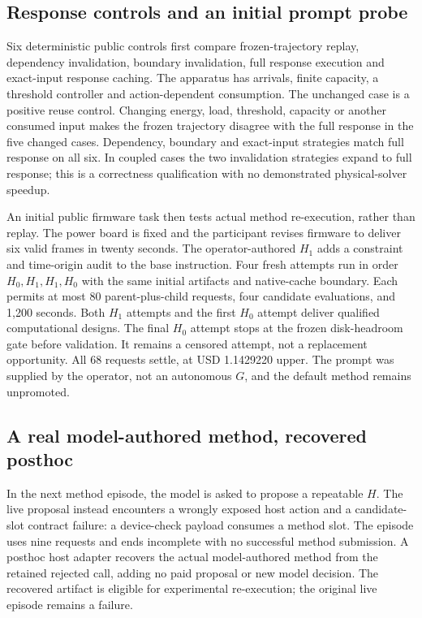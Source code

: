 \subsection{Response controls and an initial prompt probe}
Six deterministic public controls first compare frozen-trajectory replay,
dependency invalidation, boundary invalidation, full response execution and
exact-input response caching. The apparatus has arrivals, finite capacity, a
threshold controller and action-dependent consumption. The unchanged case is
a positive reuse control. Changing energy, load, threshold, capacity or another
consumed input makes the frozen trajectory disagree with the full response in
the five changed cases. Dependency, boundary and exact-input strategies match
full response on all six. In coupled cases the two invalidation strategies
expand to full response; this is a correctness qualification with no demonstrated
physical-solver speedup.

An initial public firmware task then tests actual method re-execution, rather
than replay. The power board is fixed and the participant revises firmware to
deliver six valid frames in twenty seconds. The operator-authored $H_1$ adds a
constraint and time-origin audit to the base instruction. Four fresh attempts
run in order $H_0,H_1,H_1,H_0$ with the same initial artifacts and native-cache
boundary. Each permits at most 80 parent-plus-child requests, four candidate
evaluations, and 1,200 seconds. Both $H_1$ attempts and the first $H_0$ attempt
deliver qualified computational designs. The final $H_0$ attempt stops at the
frozen disk-headroom gate before validation. It remains a censored attempt,
not a replacement opportunity. All 68 requests settle, at USD 1.1429220 upper.
The prompt was supplied by the operator, not an autonomous $G$, and the default
method remains unpromoted.

\subsection{A real model-authored method, recovered posthoc}
In the next method episode, the model is asked to propose a repeatable $H$.
The live proposal instead encounters a wrongly exposed host action and a
candidate-slot contract failure: a device-check payload consumes a method slot.
The episode uses nine requests and ends incomplete with no successful method
submission. A posthoc host adapter recovers the actual model-authored method
from the retained rejected call, adding no paid proposal or new model decision.
The recovered artifact is eligible for experimental re-execution; the original
live episode remains a failure.

